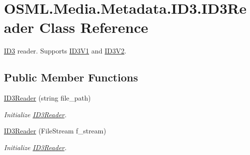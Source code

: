 \hypertarget{classOSML_1_1Media_1_1Metadata_1_1ID3_1_1ID3Reader}{}\section{O\+S\+M\+L.\+Media.\+Metadata.\+I\+D3.\+I\+D3\+Reader Class Reference}
\label{classOSML_1_1Media_1_1Metadata_1_1ID3_1_1ID3Reader}


\mbox{\hyperlink{namespaceOSML_1_1Media_1_1Metadata_1_1ID3}{I\+D3}} reader. Supports \mbox{\hyperlink{classOSML_1_1Media_1_1Metadata_1_1ID3_1_1ID3V1}{I\+D3\+V1}} and \mbox{\hyperlink{classOSML_1_1Media_1_1Metadata_1_1ID3_1_1ID3V2}{I\+D3\+V2}}.  


\subsection*{Public Member Functions}
\begin{DoxyCompactItemize}
\item 
\mbox{\hyperlink{classOSML_1_1Media_1_1Metadata_1_1ID3_1_1ID3Reader_a5304df793306ced2d9a64111537b7529}{I\+D3\+Reader}} (string file\+\_\+path)
\begin{DoxyCompactList}\small\item\em Initialize \mbox{\hyperlink{classOSML_1_1Media_1_1Metadata_1_1ID3_1_1ID3Reader}{I\+D3\+Reader}}. \end{DoxyCompactList}\item 
\mbox{\hyperlink{classOSML_1_1Media_1_1Metadata_1_1ID3_1_1ID3Reader_af6c98a7a0f2e7a8bc5f5906624abb116}{I\+D3\+Reader}} (File\+Stream f\+\_\+stream)
\begin{DoxyCompactList}\small\item\em Initialize \mbox{\hyperlink{classOSML_1_1Media_1_1Metadata_1_1ID3_1_1ID3Reader}{I\+D3\+Reader}}. \end{DoxyCompactList}\end{DoxyCompactItemize}
